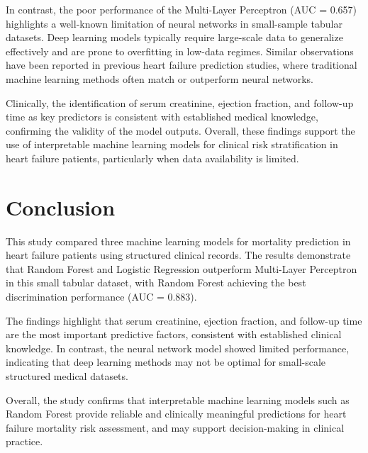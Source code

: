 \documentclass[twocolumn]{article}
\begin{document}
In contrast, the poor performance of the Multi-Layer Perceptron (AUC = 0.657) highlights a well-known limitation of neural networks in small-sample tabular datasets.\cite{rajkomar2018} Deep learning models typically require large-scale data to generalize effectively and are prone to overfitting in low-data regimes. Similar observations have been reported in previous heart failure prediction studies, where traditional machine learning methods often match or outperform neural networks.

Clinically, the identification of serum creatinine, ejection fraction, and follow-up time as key predictors is consistent with established medical knowledge, confirming the validity of the model outputs. Overall, these findings support the use of interpretable machine learning models for clinical risk stratification in heart failure patients, particularly when data availability is limited.


\section{Conclusion}

This study compared three machine learning models for mortality prediction in heart failure patients using structured clinical records. The results demonstrate that Random Forest and Logistic Regression outperform Multi-Layer Perceptron in this small tabular dataset, with Random Forest achieving the best discrimination performance (AUC = 0.883).

The findings highlight that serum creatinine, ejection fraction, and follow-up time are the most important predictive factors, consistent with established clinical knowledge. In contrast, the neural network model showed limited performance, indicating that deep learning methods may not be optimal for small-scale structured medical datasets.

Overall, the study confirms that interpretable machine learning models such as Random Forest provide reliable and clinically meaningful predictions for heart failure mortality risk assessment, and may support decision-making in clinical practice.



\printbibliography
\end{document}
